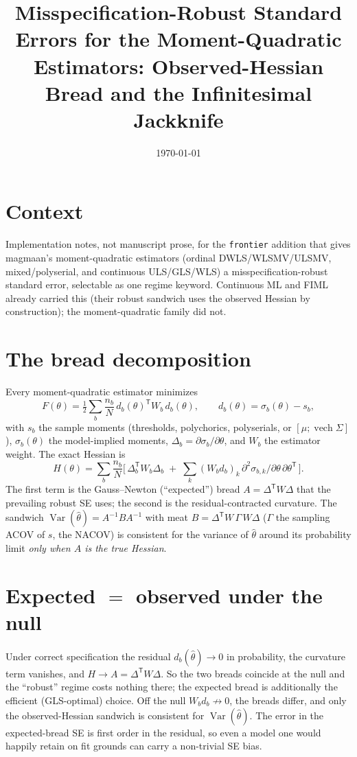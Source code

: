 \documentclass[11pt]{article}
\title{Misspecification-Robust Standard Errors for the Moment-Quadratic
Estimators: Observed-Hessian Bread and the Infinitesimal Jackknife}
\author{}
\date{\today}
\newcommand{\T}{^{\mathsf T}}
\newcommand{\thh}{\widehat\theta}
\begin{document}
\maketitle

\section*{Context}

Implementation notes, not manuscript prose, for the \texttt{frontier} addition
that gives magmaan's moment-quadratic estimators (ordinal DWLS/WLSMV/ULSMV,
mixed/polyserial, and continuous ULS/GLS/WLS) a misspecification-robust standard
error, selectable as one regime keyword. Continuous ML and FIML already carried
this (their robust sandwich uses the observed Hessian by construction); the
moment-quadratic family did not.

\section*{The bread decomposition}

Every moment-quadratic estimator minimizes
\[
  F(\theta) = \tfrac12 \sum_b \frac{n_b}{N}\, d_b(\theta)\T W_b\, d_b(\theta),
  \qquad d_b(\theta) = \sigma_b(\theta) - s_b,
\]
with $s_b$ the sample moments (thresholds, polychorics, polyserials, or
$[\mu;\operatorname{vech}\Sigma]$), $\sigma_b(\theta)$ the model-implied moments,
$\Delta_b = \partial\sigma_b/\partial\theta$, and $W_b$ the estimator weight. The
exact Hessian is
\[
  H(\theta) = \sum_b \frac{n_b}{N}\Big[\,\Delta_b\T W_b \Delta_b
  \;+\; \textstyle\sum_k (W_b d_b)_k\, \partial^2\sigma_{b,k}/\partial\theta\,\partial\theta\T\,\Big].
\]
The first term is the Gauss--Newton (``expected'') bread $A=\Delta\T W\Delta$ that
the prevailing robust SE uses; the second is the residual-contracted curvature.
The sandwich $\operatorname{Var}(\thh)=A^{-1}BA^{-1}$ with meat
$B=\Delta\T W\,\Gamma\, W\Delta$ ($\Gamma$ the sampling ACOV of $s$, the NACOV)
is consistent for the variance of $\thh$ around its probability limit
\emph{only when $A$ is the true Hessian}.

\section*{Expected $=$ observed under the null}

Under correct specification the residual $d_b(\thh)\to 0$ in probability, the
curvature term vanishes, and $H\to A=\Delta\T W\Delta$. So the two breads
coincide at the null and the ``robust'' regime costs nothing there; the expected
bread is additionally the efficient (GLS-optimal) choice. Off the null
$W_b d_b\not\to 0$, the breads differ, and only the observed-Hessian sandwich is
consistent for $\operatorname{Var}(\thh)$. The error in the expected-bread SE is
first order in the residual, so even a model one would happily retain on fit
grounds can carry a non-trivial SE bias.
\end{document}
